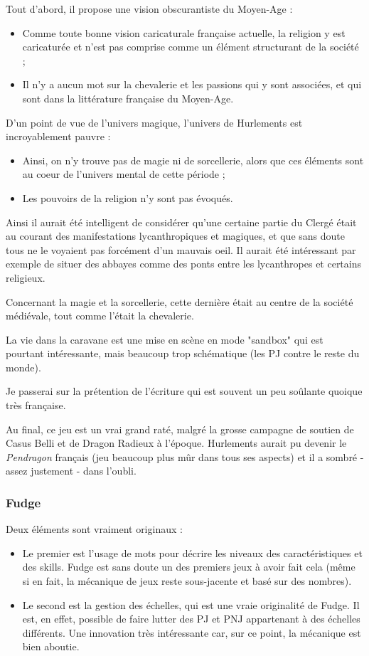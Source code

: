 \documentclass[a4paper, 11pt, twoside]{article}
\begin{document}
Tout d'abord, il propose une vision obscurantiste du Moyen-Age :
\begin{itemize}
\item Comme toute bonne vision caricaturale française actuelle, la religion y est caricaturée et n'est pas comprise comme un élément structurant de la société ;
\item Il n'y a aucun mot sur la chevalerie et les passions qui y sont associées, et qui sont dans la littérature française du Moyen-Age.
\end{itemize}

D'un point de vue de l'univers magique, l'univers de Hurlements est incroyablement pauvre :
\begin{itemize}
\item Ainsi, on n'y trouve pas de magie ni de sorcellerie, alors que ces éléments sont au coeur de l'univers mental de cette période ;
\item Les pouvoirs de la religion n'y sont pas évoqués.
\end{itemize}

Ainsi il aurait été intelligent de considérer qu'une certaine partie du Clergé était au courant des manifestations lycanthropiques et magiques, et que sans doute tous ne le voyaient pas forcément d'un mauvais oeil. Il aurait été intéressant par exemple de situer des abbayes comme des ponts entre les lycanthropes et certains religieux.

Concernant la magie et la sorcellerie, cette dernière était au centre de la société médiévale, tout comme l'était la chevalerie.

La vie dans la caravane est une mise en scène en mode "sandbox" qui est pourtant intéressante, mais beaucoup trop schématique (les PJ contre le reste du monde).

Je passerai sur la prétention de l'écriture qui est souvent un peu soûlante quoique très française.

Au final, ce jeu est un vrai grand raté, malgré la grosse campagne de soutien de Casus Belli et de Dragon Radieux à l'époque. Hurlements aurait pu devenir le \emph{Pendragon} français (jeu beaucoup plus mûr dans tous ses aspects) et il a sombré - assez justement - dans l'oubli.

\subsubsection{Fudge}
\label{sec:orgfbeea45}

Deux éléments sont vraiment originaux :
\begin{itemize}
\item Le premier est l'usage de mots pour décrire les niveaux des caractéristiques et des skills. Fudge est sans doute un des premiers jeux à avoir fait cela (même si en fait, la mécanique de jeux reste sous-jacente et basé sur des nombres).
\item Le second est la gestion des échelles, qui est une vraie originalité de Fudge. Il est, en effet, possible de faire lutter des PJ et PNJ appartenant à des échelles différents. Une innovation très intéressante car, sur ce point, la mécanique est bien aboutie.
\end{itemize}
\end{document}
